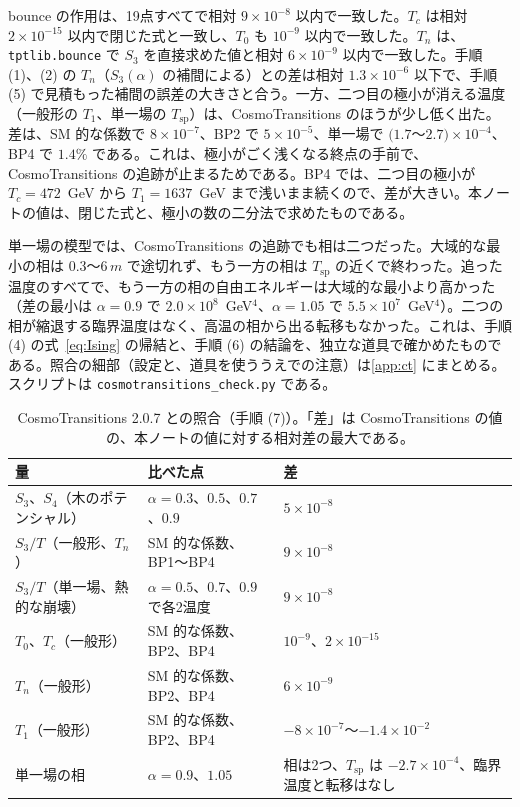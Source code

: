 \documentclass[a4paper,10pt]{ltjsarticle}
\begin{document}
bounce の作用は、19点すべてで相対 $9\times10^{-8}$ 以内で一致した。$T_c$ は相対 $2\times10^{-15}$ 以内で閉じた式と一致し、$T_0$ も $10^{-9}$ 以内で一致した。$T_n$ は、\texttt{tptlib.bounce} で $S_3$ を直接求めた値と相対 $6\times10^{-9}$ 以内で一致した。手順 (1)、(2) の $T_n$（$S_3(\alpha)$ の補間による）との差は相対 $1.3\times10^{-6}$ 以下で、手順 (5) で見積もった補間の誤差の大きさと合う。一方、二つ目の極小が消える温度（一般形の $T_1$、単一場の $T_{\mathrm{sp}}$）は、CosmoTransitions のほうが少し低く出た。差は、SM 的な係数で $8\times10^{-7}$、BP2 で $5\times10^{-5}$、単一場で $(1.7$〜$2.7)\times10^{-4}$、BP4 で $1.4\%$ である。これは、極小がごく浅くなる終点の手前で、CosmoTransitions の追跡が止まるためである。BP4 では、二つ目の極小が $T_c=472$~GeV から $T_1=1637$~GeV まで浅いまま続くので、差が大きい。本ノートの値は、閉じた式と、極小の数の二分法で求めたものである。

単一場の模型では、CosmoTransitions の追跡でも相は二つだった。大域的な最小の相は $0.3$〜$6\,m$ で途切れず、もう一方の相は $T_{\mathrm{sp}}$ の近くで終わった。追った温度のすべてで、もう一方の相の自由エネルギーは大域的な最小より高かった（差の最小は $\alpha=0.9$ で $2.0\times10^8$~GeV$^4$、$\alpha=1.05$ で $5.5\times10^7$~GeV$^4$）。二つの相が縮退する臨界温度はなく、高温の相から出る転移もなかった。これは、手順 (4) の式~\eqref{eq:Ising} の帰結と、手順 (6) の結論を、独立な道具で確かめたものである。照合の細部（設定と、道具を使ううえでの注意）は\ref{app:ct} にまとめる。スクリプトは \texttt{cosmotransitions\_check.py} である。

\begin{table}[tbp]
\centering\small
\caption{CosmoTransitions 2.0.7 との照合（手順 (7)）。「差」は CosmoTransitions の値の、本ノートの値に対する相対差の最大である。}
\label{tab:ct}
\begin{tabularx}{\linewidth}{>{\raggedright\arraybackslash}p{4.6cm}>{\raggedright\arraybackslash}X>{\raggedright\arraybackslash}p{4.2cm}}
\toprule
量 & 比べた点 & 差 \\
\midrule
$S_3$、$S_4$（木のポテンシャル） & $\alpha=0.3$、$0.5$、$0.7$、$0.9$ & $5\times10^{-8}$ \\
$S_3/T$（一般形、$T_n$） & SM 的な係数、BP1〜BP4 & $9\times10^{-8}$ \\
$S_3/T$（単一場、熱的な崩壊） & $\alpha=0.5$、$0.7$、$0.9$ で各2温度 & $9\times10^{-8}$ \\
$T_0$、$T_c$（一般形） & SM 的な係数、BP2、BP4 & $10^{-9}$、$2\times10^{-15}$ \\
$T_n$（一般形） & SM 的な係数、BP2、BP4 & $6\times10^{-9}$ \\
$T_1$（一般形） & SM 的な係数、BP2、BP4 & $-8\times10^{-7}$〜$-1.4\times10^{-2}$ \\
単一場の相 & $\alpha=0.9$、$1.05$ & 相は2つ、$T_{\mathrm{sp}}$ は $-2.7\times10^{-4}$、臨界温度と転移はなし \\
\bottomrule
\end{tabularx}
\end{table}
\end{document}
